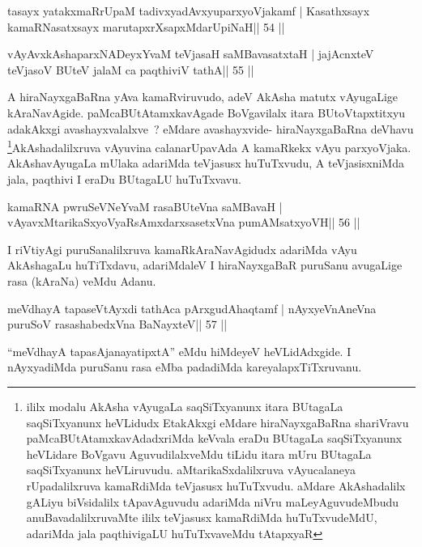 \begin{shl}
tasayx yatakxmaRrUpaM tadivxyadAvxyuparxyoVjakamf |
Kasathxsayx kamaRNasatxsayx marutapxrXsapxMdarUpiNaH\hfill || 54 ||
\end{shl}

\begin{shl}
vAyAvxkAshaparxNADeyxYvaM teVjasaH saMBavasatxtaH |
jajAcnxteV teVjasoV BUteV jalaM ca paqthiviV tathA\hfill || 55 ||
\end{shl}

\begin{artha}
A hiraNayxgaBaRna yAva kamaRviruvudo, adeV AkAsha matutx vAyugaLige
kAraNavAgide. paMcaBUtAtamxkavAgade BoVgavilalx itara BUtoVtapxtitxyu
adakAkxgi avashayxvalalxve~? eMdare avashayxvide- hiraNayxgaBaRna
deVhavu \footnote{ililx modalu AkAsha vAyugaLa saqSiTxyanunx itara
BUtagaLa saqSiTxyanunx heVLidudx EtakAkxgi eMdare hiraNayxgaBaRna
shariVravu paMcaBUtAtamxkavAdadxriMda keVvala eraDu BUtagaLa
saqSiTxyanunx heVLidare BoVgavu AguvudilalxveMdu tiLidu itara mUru
BUtagaLa saqSiTxyanunx heVLiruvudu. aMtarikaSxdalilxruva
vAyucalaneya rUpadalilxruva kamaRdiMda teVjasusx huTuTxvudu. aMdare
AkAshadalilx gALiyu biVsidalilx tApavAguvudu adariMda niVru
maLeyAguvudeMbudu anuBavadalilxruvaMte ililx teVjasusx kamaRdiMda
huTuTxvudeMdU, adariMda jala paqthivigaLU huTuTxvaveMdu tAtapxyaR}AkAshadalilxruva vAyuvina calanarUpavAda A
kamaRkekx vAyu parxyoVjaka. AkAshavAyugaLa mUlaka adariMda teVjasusx huTuTxvudu, A
teVjasisxniMda jala, paqthivi I eraDu BUtagaLU huTuTxvavu.
\end{artha}

\begin{shl}
kamaRNA pwruSeVNeYvaM rasaBUteVna saMBavaH |
vAyavxMtarikaSxyoVyaRsAmxdarxsasetxVna pumAMsatxyoVH\hfill || 56 ||
\end{shl}

\begin{artha}
I riVtiyAgi puruSanalilxruva kamaRkAraNavAgidudx adariMda vAyu AkAshagaLu huTiTxdavu, adariMdaleV I hiraNayxgaBaR puruSanu avugaLige rasa (kAraNa) veMdu Adanu.
\end{artha}

\begin{shl}
meVdhayA tapaseVtAyxdi tathAca pArxgudAhaqtamf |
nAyxyeVnAneVna puruSoV rasashabedxVna BaNayxteV\hfill || 57 ||
\end{shl}

\begin{artha}
``meVdhayA tapasA\s janayatipxtA'' eMdu hiMdeyeV heVLidAdxgide. I nAyxyadiMda puruSanu rasa eMba padadiMda kareyalapxTiTxruvanu.
\end{artha}

